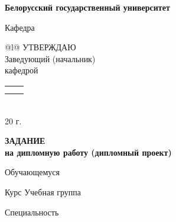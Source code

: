 \begin{center}
\textbf{\large Белорусский государственный университет}
\end{center}

\noindent Кафедра 

\vspace{0.2cm}

\begin{flushright}
\begin{tabular}{@{}l@{}}
УТВЕРЖДАЮ \\
Заведующий (начальник) \\
кафедрой \\[0.2cm]
\begin{tabular}{@{}l@{\hspace{1.8cm}}l@{}}
\ufield{4.2cm}{} & \ufield{5.5cm}{Саечников В.А.} \\
\makebox[4.2cm][c]{\scriptsize (подпись)} & \makebox[5.5cm][c]{\scriptsize (фамилия, инициалы)}
\end{tabular} \\[0.8cm]
\ufield{3cm}{} 20\ufield{1cm}{} г.
\end{tabular}
\end{flushright}

\begin{center}
\textbf{\large ЗАДАНИЕ} \\
\textbf{\large на дипломную работу (дипломный проект)}
\end{center}

\noindent Обучающемуся  \\[0.cm]
\hspace*{3.2cm}

\noindent Курс  \hspace{1.5cm} Учебная группа 

\noindent Специальность  \\
 \\

